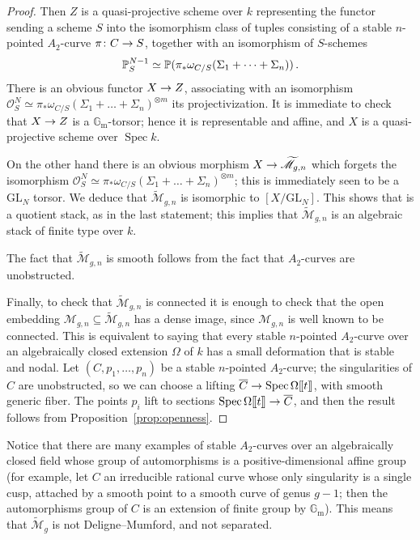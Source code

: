\documentclass[a4paper, 10pt]{amsart}
\numberwithin{equation}{section}
\numberwithin{subsection}{section}
\theoremstyle{definition}
\theoremstyle{remark}
\renewcommand{\mathcal}{\mathscr}
\newcommand\cM{\mathcal{M}} \newcommand\cN{\mathcal{N}}
\newcommand\cO{\mathcal{O}} \newcommand\cP{\mathcal{P}}
\newcommand\GG{\mathbb{G}} \newcommand\HH{\mathbb{H}}
\newcommand\rmm{\mathrm{m}} \newcommand\rmn{\mathrm{n}}
\newcommand\arr{\ifinner\to\else\longrightarrow\fi}
\newcommand\spec{\operatorname{Spec}}
\newcommand{\gm}{\GG_{\rmm}}
\newcommand{\GL}{\mathrm{GL}}
\newcommand{\ds}[1]{[\mspace{-2mu}[#1]\mspace{-2mu}]}
\newcommand{\mt}{\widetilde{\mathcal M}}
\begin{document}
\begin{proof}
		Then $Z$ is a quasi-projective scheme over $k$ representing the functor sending a scheme $S$ into the isomorphism class of tuples consisting of a stable $n$-pointed $A_{2}$-curve $\pi\colon C \arr S$, together with an isomorphism of $S$-schemes
		\[
		\mathbb{P}^{N-1}_{S} \simeq \mathbb{P}(\pi_{*}\omega_{C/S}(\Sigma_{1} + \dots + \Sigma_{n}))\,.
		\]
		There is an obvious functor $X \arr Z$, associating with an isomorphism $\cO_{S}^{N} \simeq \pi_{*}\omega_{C/S}(\Sigma_{1}+ \dots + \Sigma_{n})^{\otimes m}$ its projectivization. It is immediate to check that $X \arr Z$ is a $\gm$-torsor; hence it is representable and affine, and $X$ is a quasi-projective scheme over $\spec k$.
		
		On the other hand there is an obvious morphism $X \arr \mt_{g,n}$ which forgets the isomorphism $\cO_{S}^{N} \simeq \pi_{*}\omega_{C/S}(\Sigma_{1}+ \dots + \Sigma_{n})^{\otimes m}$; this is immediately seen to be a $\GL_{N}$ torsor. We deduce that $\mt_{g,n}$ is isomorphic to $[X/\GL_{N}]$. This shows that is a quotient stack, as in the last statement; this implies that $\mt_{g,n}$ is an algebraic stack of finite type over $k$.
		
		The fact that $\mt_{g,n}$ is smooth follows from the fact that $A_{2}$-curves are unobstructed.
		
		Finally, to check that $\mt_{g,n}$ is connected it is enough to check that the open embedding $\cM_{g,n} \subseteq \mt_{g,n}$ has a dense image, since $\cM_{g,n}$ is well known to be connected. This is equivalent to saying that every stable $n$-pointed $A_{2}$-curve over an algebraically closed extension $\Omega$ of $k$ has a small deformation that is stable and nodal. Let $(C, p_{1}, \dots, p_{n})$ be a stable $n$-pointed $A_{2}$-curve; the singularities of $C$ are unobstructed, so we can choose a lifting $\overline{C}\arr \spec \Omega\ds{t}$, with smooth generic fiber. The points $p_{i}$ lift to sections $\spec\Omega\ds{t} \arr \overline{C}$, and then the result follows from  Proposition~\ref{prop:openness}.
	\end{proof}
	
	Notice that there are many examples of stable $A_2$-curves over an algebraically closed field whose group of automorphisms is a positive-dimensional affine group (for example, let $C$ an irreducible rational curve whose only singularity is a single cusp, attached by a smooth point to a smooth curve of genus $g-1$; then the automorphisms group of $C$ is an extension of finite group by $\gm$). This means that $\mt_{g}$ is not Deligne--Mumford, and not separated.
	
\end{document}
